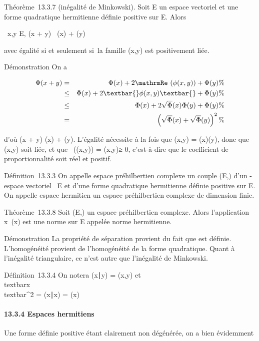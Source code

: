 \documentclass[]{article}
\begin{document}
Théorème~13.3.7 (inégalité de Minkowski). Soit E un  espace vectoriel
et \Phi une forme quadratique hermitienne définie positive sur E. Alors

\forall~x,y \in E, \sqrt\Phi(x + y)~
\leq\sqrt\Phi(x) + \sqrt\Phi(y)

avec égalité si et seulement si~la famille (x,y) est positivement liée.

Démonstration On a

\begin{align*} \Phi(x + y)& =& \Phi(x) +
2\mathrmRe~(\phi(x,y)) +
\Phi(y)\%& \\ & \leq& \Phi(x) +
2\textbar{}\phi(x,y)\textbar{} + \Phi(y) \%& \\
& \leq& \Phi(x) + 2\sqrt\Phi(x)\Phi(y) + \Phi(y)\%&
\\ & =& \left
(\sqrt\Phi(x) +
\sqrt\Phi(y)\right )^2 \%&
\\ \end{align*}

d'où \sqrt\Phi(x + y) \leq\sqrt\Phi(x) +
\sqrt\Phi(y). L'égalité nécessite à la fois que
\textbar{}\phi(x,y)\textbar{} = \sqrt\Phi(x)\Phi(y), donc que
(x,y) soit liée, et que
\mathrmRe~(\phi(x,y)) =
\textbar{}\phi(x,y)\textbar{}≥ 0, c'est-à-dire que le coefficient de
proportionnalité soit réel et positif.

Définition~13.3.3 On appelle espace préhilbertien complexe un couple
(E,\Phi) d'un -espace vectoriel ~E et d'une forme quadratique hermitienne
définie positive sur E. On appelle espace hermitien un espace
préhilbertien complexe de dimension finie.

Théorème~13.3.8 Soit (E,\Phi) un espace préhilbertien complexe. Alors
l'application x\mapsto~\sqrt\Phi(x)
est une norme sur E appelée norme hermitienne.

Démonstration La propriété de séparation provient du fait que \Phi est
définie. L'homogénéité provient de l'homogénéité de la forme
quadratique. Quant à l'inégalité triangulaire, ce n'est autre que
l'inégalité de Minkowski.

Définition~13.3.4 On notera (x∣y) = \phi(x,y) et
\\textbar{}x\\textbar{}^2 =
(x∣x) = \Phi(x)

\paragraph{13.3.4 Espaces hermitiens}

Une forme définie positive étant clairement non dégénérée, on a bien
évidemment
\end{document}
